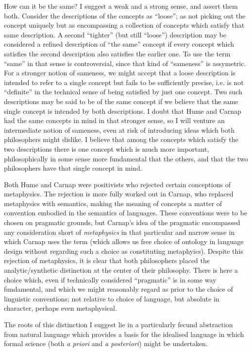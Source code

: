 \documentclass[10pt,titlepage]{article}
\begin{document}
How can it be the same?
I suggest a weak and a strong sense, and assert them both.
Consider the descriptions of the concepts as ``loose''; as not picking out the concept uniquely but as encompassing a collection of concepts which satisfy that same description.
A second ``tighter'' (but still ``loose'') description may be considered a refined description of ``the same'' concept if every concept which satisfies the second description also satisfies the earlier one.
To use the term ``same'' in that sense is controversial, since that kind of ``sameness'' is assymetric.
For a stronger notion of sameness, we might accept that a loose description is intended to refer to a single concept but fails to be sufficiently precise, i.e. is not ``definite'' in the technical sense of being satisfied by just one concept.
Two such descriptions may be said to be of the same concept if we believe that the same single concept is intended by both descriptions.
I doubt that Hume and Carnap had the same concepts in mind in that stronger sense, so I will venture an intermediate notion of sameness, even at risk of introducing ideas which both philosophers might dislike.
I believe that among the concepts which satisfy the two descriptions there is one concept which is much more important, philosophically in some sense more fundamental that the others, and that the two philosophers have that single concept in mind.

Both Hume and Carnap were positivists who rejected certain conceptions of metaphysics.
The rejection is more fully worked out in Carnap, who replaced metaphysics with semantics, making the meaning of concepts a matter of convention embodied in the semantics of languages.
These conventions were to be chosen on pragmatic grounds, but Carnap's idea of the pragmatic encompassed any consideration short of \emph{metaphysics} in that particular and narrow sense in which Carnap uses the term (which allows us free choice of ontology in language design without regarding such a choice as constituting metaphyics).
Despite this rejection of metaphysics, it is clear that both philosophers placed the analytic/synthetic distinction at the center of their philosophy.
There is here a choice which, even if technically considered ``pragmatic'' is in some way fundamental, and which we might reasonably regard as prior to the choice of linguistic conventions; not relative to choice of language, but absolute in character, perhaps even metaphysical.

The roots of this distinction I suggest lie in a particularly fecund abstraction from natural language which provides a basis for the idealised language in which formal science (both \emph{a priori} and \emph{a posteriori}) might be undertaken.
\end{document}
